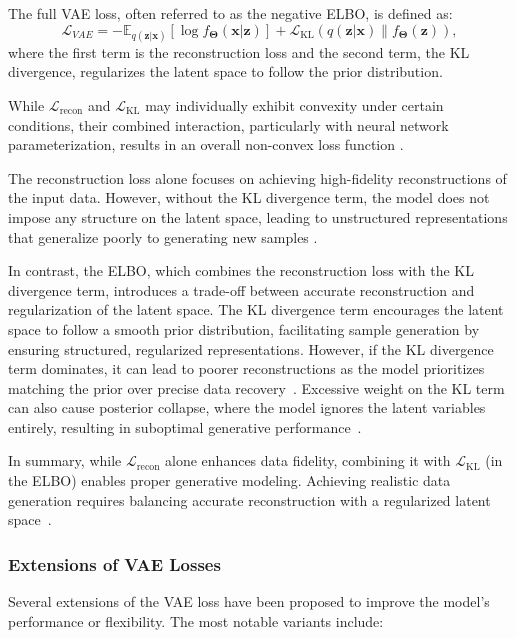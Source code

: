 \documentclass[sn-mathphys-num]{sn-jnl}%
\renewcommand\vec{\mathbf}
\begin{document}
The full VAE loss, often referred to as the negative ELBO, is defined as:
\begin{equation}\label{eq:vae_loss}
    \mathcal{L}_{VAE} = -\mathbb{E}_{q(\mathbf{z}|\mathbf{x})}[\log f_{\vec{\Theta}}(\mathbf{x}|\mathbf{z})] + \mathcal{L}_{\text{KL}}(q(\mathbf{z}|\mathbf{x}) \| f_{\vec{\Theta}}(\mathbf{z})),
\end{equation}
where the first term is the reconstruction loss and the second term, the KL divergence, regularizes the latent space to follow the prior distribution.

While $\mathcal{L}_{\text{recon}}$ and $\mathcal{L}_{\text{KL}}$ may individually exhibit convexity under certain conditions, their combined interaction, particularly with neural network parameterization, results in an overall non-convex loss function \cite{ML_3,rezende2014stochastic,kingma2013auto}. 

\bigskip

The reconstruction loss alone focuses on achieving high-fidelity reconstructions of the input data. However, without the KL divergence term, the model does not impose any structure on the latent space, leading to unstructured representations that generalize poorly to generating new samples \cite{kingma2013auto,rezende2014stochastic}.

In contrast, the ELBO, which combines the reconstruction loss with the KL divergence term, introduces a trade-off between accurate reconstruction and regularization of the latent space. The KL divergence term encourages the latent space to follow a smooth prior distribution, facilitating sample generation by ensuring structured, regularized representations. However, if the KL divergence term dominates, it can lead to poorer reconstructions as the model prioritizes matching the prior over precise data recovery~\cite{higgins2017beta}. Excessive weight on the KL term can also cause posterior collapse, where the model ignores the latent variables entirely, resulting in suboptimal generative performance~\cite{bowman2015generating,alemi2018fixing}.

In summary, while $\mathcal{L}_{\text{recon}}$ alone enhances data fidelity, combining it with $\mathcal{L}_{\text{KL}}$ (in the ELBO) enables proper generative modeling. Achieving realistic data generation requires balancing accurate reconstruction with a regularized latent space~\cite{burgess2018understanding}.


\subsubsection{Extensions of VAE Losses}
Several extensions of the VAE loss have been proposed to improve the model's performance or flexibility. The most notable variants include:
\end{document}
